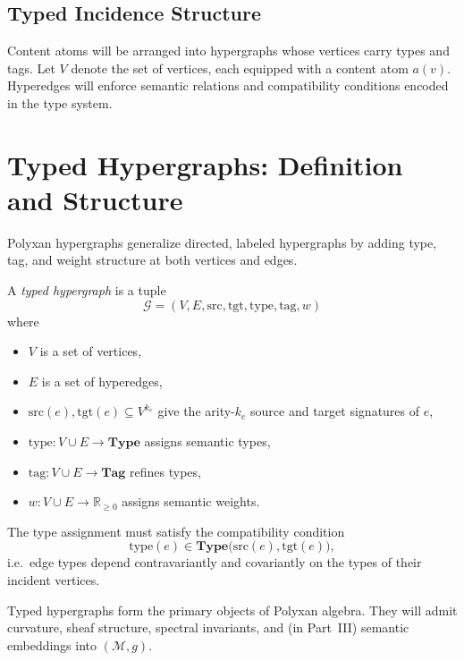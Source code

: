 \subsection{Typed Incidence Structure}

Content atoms will be arranged into hypergraphs whose vertices carry types and
tags.  Let $V$ denote the set of vertices, each equipped with a content atom
$a(v)$.  Hyperedges will enforce semantic relations and compatibility
conditions encoded in the type system.

\section{Typed Hypergraphs: Definition and Structure}

Polyxan hypergraphs generalize directed, labeled hypergraphs by adding
type, tag, and weight structure at both vertices and edges.

\begin{definition}
A \emph{typed hypergraph} is a tuple
\[
\mathcal{G} = (V,E,\mathrm{src},\mathrm{tgt}, \mathrm{type},\mathrm{tag}, w)
\]
where
\begin{itemize}
\item $V$ is a set of vertices,
\item $E$ is a set of hyperedges,
\item $\mathrm{src}(e),\mathrm{tgt}(e) \subseteq V^{k_e}$ give the arity-$k_e$
  source and target signatures of $e$,
\item $\mathrm{type}: V\cup E \to \mathbf{Type}$ assigns semantic types,
\item $\mathrm{tag}: V\cup E \to \mathbf{Tag}$ refines types,
\item $w: V\cup E \to \mathbb{R}_{\ge 0}$ assigns semantic weights.
\end{itemize}
\end{definition}

The type assignment must satisfy the compatibility condition
\[
\mathrm{type}(e) \in \mathbf{Type}\big(\mathrm{src}(e),\mathrm{tgt}(e)\big),
\]
i.e.~edge types depend contravariantly and covariantly on the types of their
incident vertices.

Typed hypergraphs form the primary objects of Polyxan algebra.  They will
admit curvature, sheaf structure, spectral invariants, and (in Part~III)
semantic embeddings into $(\mathcal{M},g)$.

